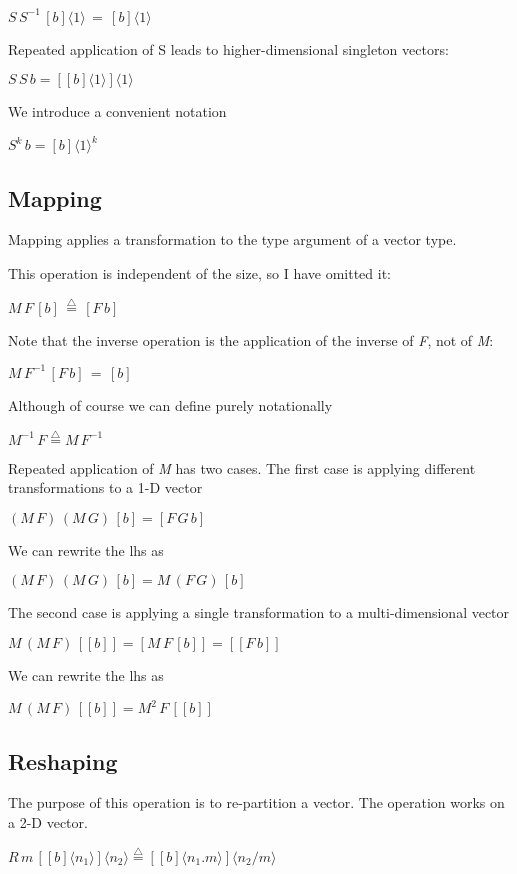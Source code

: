 \documentclass{article}
\begin{document}
$S\, S^{-1}\,[b]\langle1\rangle\,=\,[b]\langle1\rangle$

Repeated application of S leads to higher-dimensional singleton vectors:

$S\, S\, b=[[b]\langle1\rangle]\langle1\rangle$

We introduce a convenient notation

$S^{k}\, b=[b]\langle1\rangle^{k}$


\subsection{Mapping}

Mapping applies a transformation to the type argument of a vector
type.

This operation is independent of the size, so I have omitted it:

$M\, F\,[b]\,\overset{{\scriptscriptstyle \triangle}}{=}\,[F\, b]$

Note that the inverse operation is the application of the inverse
of \emph{F}, not of \emph{M}:

$M\, F^{-1}\,[F\, b]\,=\,[b]$

Although of course we can define purely notationally

$M^{-1}\, F\overset{{\scriptscriptstyle \triangle}}{=}M\, F^{-1}$

Repeated application of \emph{M} has two cases. The first case is
applying different transformations to a 1-D vector

$(M\, F)\,(M\, G)\,[b]=[F\, G\, b]$

We can rewrite the lhs as

$(M\, F)\,(M\, G)\,[b]=M\,(F\, G)\,[b]$

The second case is applying a single transformation to a multi-dimensional
vector

$M\,(M\, F)\,[[b]]=[M\, F\,[b]]=[[F\, b]]$

We can rewrite the lhs as

$M\,(M\, F)\,[[b]]=M^{2}\, F\,[[b]]$


\subsection{Reshaping}

The purpose of this operation is to re-partition a vector. The operation
works on a 2-D vector.

$R\, m\,[[b]\langle n_{1}\rangle]\langle n_{2}\rangle\overset{{\scriptscriptstyle \triangle}}{=}[[b]\langle n_{1}.m\rangle]\langle n_{2}/m\rangle$
\end{document}
